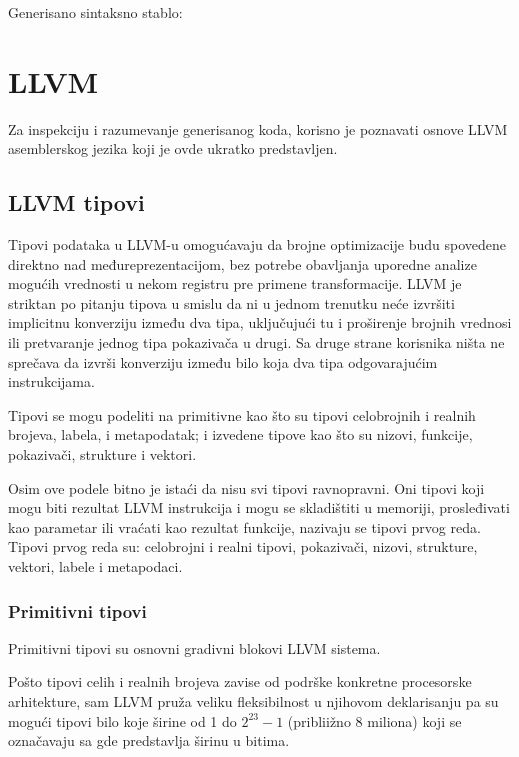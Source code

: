 

Generisano sintaksno stablo:




\chapter{LLVM}
\label{ch:llvm}
Za inspekciju i razumevanje generisanog koda, korisno je poznavati osnove LLVM asemblerskog jezika koji je ovde ukratko predstavljen.

\section{LLVM tipovi}

Tipovi podataka u LLVM-u omogućavaju da brojne optimizacije budu spovedene direktno nad međureprezentacijom, 
bez potrebe obavljanja uporedne analize mogućih vrednosti u nekom registru pre primene transformacije.
LLVM je striktan po pitanju tipova u smislu da ni u jednom trenutku neće izvršiti implicitnu konverziju između dva tipa, 
uključujući tu i proširenje brojnih vrednosi ili pretvaranje jednog tipa pokazivača u drugi. 
Sa druge strane korisnika ništa ne sprečava da izvrši konverziju između bilo koja dva tipa odgovarajućim instrukcijama.

Tipovi se mogu podeliti na primitivne kao što su tipovi celobrojnih i realnih brojeva, labela, i metapodatak; 
i izvedene tipove kao što su nizovi, funkcije, pokazivači, strukture i vektori.

Osim ove podele bitno je istaći da nisu svi tipovi ravnopravni.
Oni tipovi koji mogu biti rezultat LLVM instrukcija i mogu se skladištiti u memoriji, prosleđivati kao parametar ili vraćati kao rezultat funkcije, nazivaju se tipovi prvog reda. Tipovi prvog reda su: celobrojni i realni tipovi, pokazivači, nizovi, strukture, vektori, labele i metapodaci.


\subsection*{Primitivni tipovi}

Primitivni tipovi su osnovni gradivni blokovi LLVM sistema.

Pošto tipovi celih i realnih brojeva zavise od podrške konkretne procesorske arhitekture,
sam LLVM pruža veliku fleksibilnost u njihovom deklarisanju
pa su mogući tipovi bilo koje širine od 1 do $2^{23} - 1$ (pribliižno 8 miliona) koji se označavaju sa  gde  predstavlja širinu u bitima.

